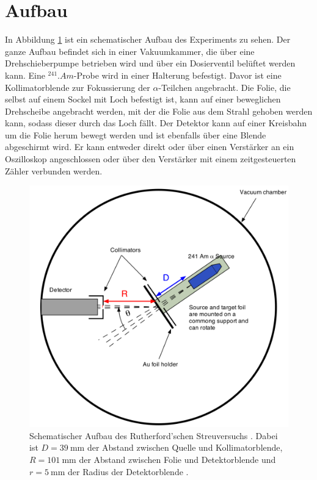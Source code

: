 \section{Aufbau}
\label{sec:Aufbau}

In Abbildung \ref{fig:Aufbau} ist ein schematischer Aufbau des Experiments zu sehen.
Der ganze Aufbau befindet sich in einer Vakuumkammer, die über eine Drehschieberpumpe betrieben wird und über ein Dosierventil belüftet werden kann.
Eine $^{241}.{Am}$-Probe wird in einer Halterung befestigt. Davor ist eine Kollimatorblende zur Fokussierung der $\alpha$-Teilchen angebracht.
Die Folie, die selbst auf einem Sockel mit Loch befestigt ist, kann auf einer beweglichen Drehscheibe angebracht werden, mit der die Folie aus dem Strahl gehoben werden kann, sodass dieser durch das Loch fällt.
Der Detektor kann auf einer Kreisbahn um die Folie herum bewegt werden und ist ebenfalls über eine Blende abgeschirmt wird.
Er kann entweder direkt oder über einen Verstärker an ein Oszilloskop angeschlossen oder über den Verstärker mit einem zeitgesteuerten Zähler verbunden werden.

\begin{figure}
\centering
\includegraphics[width=\linewidth-70pt,keepaspectratio]{content/images/Aufbau2.pdf}
\caption{Schematischer Aufbau des Rutherford'schen Streuversuchs \cite{Aufbau16}.
Dabei ist $D=\SI{39}{\milli\meter}$ der Abstand zwischen Quelle und Kollimatorblende, $R=\SI{101}{\milli\meter}$ der Abstand zwischen Folie und Detektorblende und $r=\SI{5}{\milli\meter}$ der Radius der Detektorblende \cite{V16}.}
\label{fig:Aufbau}
\end{figure}

